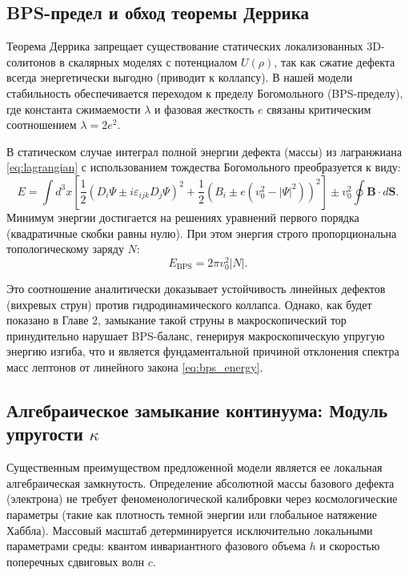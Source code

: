 \documentclass[12pt,a4paper]{article}
\begin{document}
\subsection{BPS-предел и обход теоремы Деррика}
Теорема Деррика запрещает существование статических локализованных 3D-солитонов в скалярных моделях с потенциалом $U(\rho)$, так как сжатие дефекта всегда энергетически выгодно (приводит к коллапсу). 
В нашей модели стабильность обеспечивается переходом к пределу Богомольного (BPS-пределу), где константа сжимаемости $\lambda$ и фазовая жесткость $e$ связаны критическим соотношением $\lambda = 2e^2$.
	
В статическом случае интеграл полной энергии дефекта (массы) из лагранжиана \eqref{eq:lagrangian} с использованием тождества Богомольного преобразуется к виду:
\begin{equation}
E = \int d^3x \left[ \frac{1}{2} \left( D_i \Psi \pm i \varepsilon_{ijk} D_j \Psi \right)^2 + \frac{1}{2} \left( B_i \pm e(v_0^2 - |\Psi|^2) \right)^2 \right] \pm v_0^2 \oint \mathbf{B} \cdot d\mathbf{S}.
\end{equation}
Минимум энергии достигается на решениях уравнений первого порядка (квадратичные скобки равны нулю). При этом энергия строго пропорциональна топологическому заряду $N$:
\begin{equation}
E_{\text{BPS}} = 2\pi v_0^2 |N|.
\label{eq:bps_energy}
\end{equation}
	
Это соотношение аналитически доказывает устойчивость линейных дефектов (вихревых струн) против гидродинамического коллапса. Однако, как будет показано в Главе 2, замыкание такой струны в макроскопический тор принудительно нарушает BPS-баланс, генерируя макроскопическую упругую энергию изгиба, что и является фундаментальной причиной отклонения спектра масс лептонов от линейного закона \eqref{eq:bps_energy}.

\subsection{Алгебраическое замыкание континуума: Модуль упругости $\kappa$}
Существенным преимуществом предложенной модели является ее локальная алгебраическая замкнутость. Определение абсолютной массы базового дефекта (электрона) не требует феноменологической калибровки через космологические параметры (такие как плотность темной энергии или глобальное натяжение Хаббла). Массовый масштаб детерминируется исключительно локальными параметрами среды: квантом инвариантного фазового объема $h$ и скоростью поперечных сдвиговых волн $c$.
\end{document}
